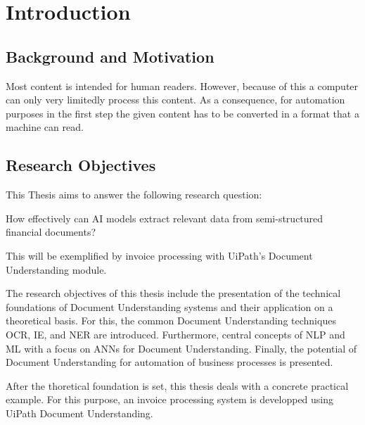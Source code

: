 \chapter{Introduction}

\section{Background and Motivation}

Most content is intended for human readers. However, because of this a computer can only very limitedly process this content. As a consequence, for automation purposes in the first step the given content has to be converted in a format that a machine can read.
\section{Research Objectives}

This Thesis aims to answer the following research question:

How effectively can AI models extract relevant data from semi-structured financial documents?

This will be exemplified by invoice processing with UiPath's Document Understanding module.


The research objectives of this thesis include the presentation of the technical foundations of Document Understanding systems and their application on a theoretical basis.
For this, the common Document Understanding techniques \ac{OCR}, \ac{IE}, and \ac{NER} are introduced. 
Furthermore, central concepts of \ac{NLP} and \ac{ML} with a focus on \acp{ANN} for Document Understanding. 
Finally, the potential of Document Understanding for automation of business processes is presented.

After the thoretical foundation is set, this thesis deals with a concrete practical example. 
For this purpose, an invoice processing system is developped using UiPath Document Understanding.